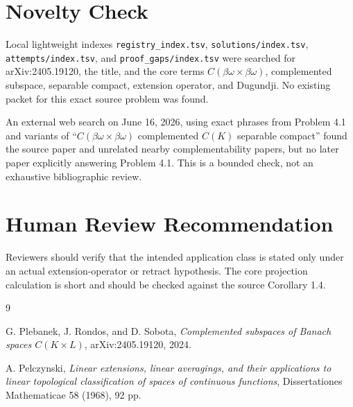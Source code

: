 \documentclass[11pt]{article}
\newcommand{\C}{C}
\newcommand{\bomega}{\beta\omega}
\begin{document}
\section*{Novelty Check}

Local lightweight indexes \texttt{registry\_index.tsv},
\texttt{solutions/index.tsv}, \texttt{attempts/index.tsv}, and
\texttt{proof\_gaps/index.tsv} were searched for arXiv:2405.19120, the title,
and the core terms
\(\C(\bomega\times\bomega)\), complemented subspace, separable compact,
extension operator, and Dugundji.  No existing packet for this exact source
problem was found.

An external web search on June 16, 2026, using exact phrases from Problem 4.1
and variants of ``\(\C(\bomega\times\bomega)\) complemented \(\C(K)\)
separable compact'' found the source paper and unrelated nearby
complementability papers, but no later paper explicitly answering Problem 4.1.
This is a bounded check, not an exhaustive bibliographic review.

\section*{Human Review Recommendation}

Reviewers should verify that the intended application class is stated only
under an actual extension-operator or retract hypothesis.  The core projection
calculation is short and should be checked against the source Corollary 1.4.

\begin{thebibliography}{9}

G. Plebanek, J. Rondos, and D. Sobota,
\emph{Complemented subspaces of Banach spaces \(\C(K\times L)\)},
arXiv:2405.19120, 2024.

A. Pelczynski,
\emph{Linear extensions, linear averagings, and their applications to linear
topological classification of spaces of continuous functions},
Dissertationes Mathematicae 58 (1968), 92 pp.

\end{thebibliography}
\end{document}

